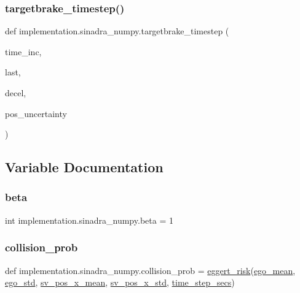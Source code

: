 \subsubsection{\texorpdfstring{targetbrake\+\_\+timestep()}{targetbrake\_timestep()}}
{\footnotesize\ttfamily def implementation.\+sinadra\+\_\+numpy.\+targetbrake\+\_\+timestep (\begin{DoxyParamCaption}\item[{}]{time\+\_\+inc,  }\item[{}]{last,  }\item[{}]{decel,  }\item[{}]{pos\+\_\+uncertainty }\end{DoxyParamCaption})}



\subsection{Variable Documentation}
\mbox{\label{namespaceimplementation_1_1sinadra__numpy_a46e710322c0614f31e91a06300914f57}} 
\subsubsection{\texorpdfstring{beta}{beta}}
{\footnotesize\ttfamily int implementation.\+sinadra\+\_\+numpy.\+beta = 1}

\mbox{\label{namespaceimplementation_1_1sinadra__numpy_a9e18ed66f6c61c6adea2d1230d44cb9d}} 
\subsubsection{\texorpdfstring{collision\+\_\+prob}{collision\_prob}}
{\footnotesize\ttfamily def implementation.\+sinadra\+\_\+numpy.\+collision\+\_\+prob = \hyperlink{namespaceimplementation_1_1sinadra__numpy_a1b621325a54fc077f500c4fb8becb427}{eggert\+\_\+risk}(\hyperlink{namespaceimplementation_1_1sinadra__numpy_a03968fe07c6e67dc7cb0cca30fb4957f}{ego\+\_\+mean}, \hyperlink{namespaceimplementation_1_1sinadra__numpy_a9faba76b4cca2e2c06b3b5153cc34c62}{ego\+\_\+std}, \hyperlink{namespaceimplementation_1_1sinadra__numpy_a9e4d923a830ff18359b063c459ad086e}{sv\+\_\+pos\+\_\+x\+\_\+mean}, \hyperlink{namespaceimplementation_1_1sinadra__numpy_af027725f7945a29278667e52ce882d34}{sv\+\_\+pos\+\_\+x\+\_\+std}, \hyperlink{namespaceimplementation_1_1sinadra__numpy_a12dc648a1f889bc02c3353e9e40c449b}{time\+\_\+step\+\_\+secs})}

